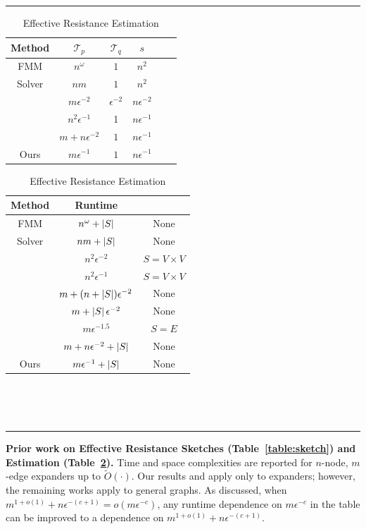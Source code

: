\begin{table}[ht]
\hrule
\centering
\begin{minipage}[t]{.45\linewidth}
    \centering
    \caption{Sketch}
    \label{table:sketch}
    \begin{tabular}{c c c c c c }
    \toprule
    Method & $\mathcal{T}_p$ & $\mathcal{T}_q$ & $s$ \\
    \midrule
    FMM & $ n^\omega $ & $1$ & $n^2$ \\
    Solver & $ nm $ & $1$ & $n^2$ \\
    \cite{spielman2009graph} & $m\epsilon^{-2}$ & $\epsilon^{-2}$ & $n\epsilon^{-2}$ \\
    \cite{JS2018} & $n^2\epsilon^{-1}$ & 1 & $n\epsilon^{-1}$ \\
    \cite{li2022new} & $m + n \epsilon^{-2}$ & $1$ & $n\epsilon^{-1}$ \\
    Ours & $m \epsilon^{-1}$ & $1$ & $n\epsilon^{-1}$ \\
    \end{tabular}
\end{minipage}%
\begin{minipage}[t]{.55\linewidth}
    \centering
    \caption{Effective Resistance Estimation}
    \label{table:estimate}
    \begin{tabular}{c c c  }
    \toprule
     Method & Runtime & \makecell{\makecell{Restriction}} \\
    \midrule
    FMM & $n^\omega + \left| S \right|$ & None \\
    Solver & $n m + \left| S \right|$ & None \\
    \cite{spielman2009graph} & $n^2\epsilon^{-2}$ & $S = V \times V$ \\
    \cite{JS2018} & $n^2\epsilon^{-1}$ & $S = V \times V$\\
    \cite{durfee2017sampling} & $m + (n + \left| S \right|)\epsilon^{-2}$ & None \\
    \cite{HuanSchild2018} & $m + \left| S \right|\epsilon^{-2}$ & None \\
    \cite{chu2018graph} & $m\epsilon^{-1.5}$ & $S = E$ \\
    \cite{li2022new} & $m + n\epsilon^{-2} + \left| S \right|$ & None \\
    Ours & $m\epsilon^{-1} + \left| S \right|$ & None \\
    \end{tabular} \\
\end{minipage}
\\[1ex]
\hrule 
\vspace*{.2cm}
\parbox{\linewidth}{\textbf{Prior work on Effective Resistance Sketches (Table~\ref{table:sketch}) and Estimation (Table~\ref{table:estimate}).} Time and space complexities are reported for $n$-node, $m$-edge expanders
up to $\widetilde{O}(\cdot)$. Our results and \cite{li2022new} apply only to expanders; however, the remaining works apply to general graphs. As discussed, when $m^{1 + o(1)} + n \epsilon^{-(c+1)} = o(m\epsilon^{-c})$, any runtime dependence on $m\epsilon^{-c}$ in the table can be improved to a dependence on $m^{1 + o(1)} + n \epsilon^{-(c+1)}$.
} 
\vspace{-1em}
\end{table}

